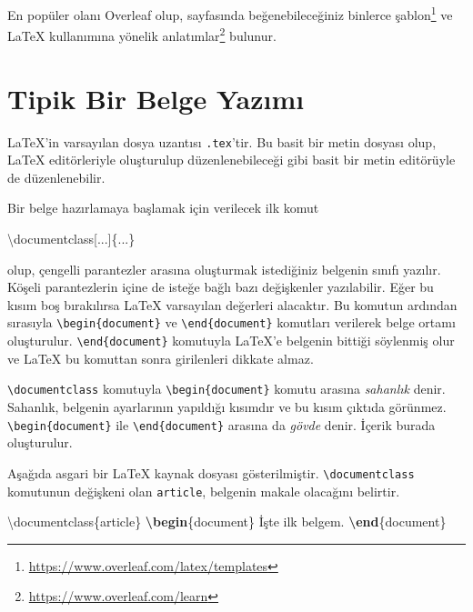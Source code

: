 \documentclass[
  10pt,
]{scrbook}
\newenvironment{Shaded}{\begin{snugshade}}{\end{snugshade}}
\newcommand{\BuiltInTok}[1]{#1}
\newcommand{\ExtensionTok}[1]{#1}
\newcommand{\KeywordTok}[1]{\textcolor[rgb]{0.13,0.29,0.53}{\textbf{#1}}}
\newcommand{\NormalTok}[1]{#1}
\renewcommand{\href}[2]{#2\footnote{\url{#1}}}
\theoremstyle{definition}
\theoremstyle{definition}
\theoremstyle{definition}
\theoremstyle{definition}
\theoremstyle{remark}
\begin{document}
En popüler olanı Overleaf olup, sayfasında beğenebileceğiniz binlerce \href{https://www.overleaf.com/latex/templates}{şablon} ve LaTeX kullanımına yönelik \href{https://www.overleaf.com/learn}{anlatımlar} bulunur.

\hypertarget{tipik}{%
\section{Tipik Bir Belge Yazımı}\label{tipik}}

LaTeX'in varsayılan dosya uzantısı \texttt{.tex}'tir. Bu basit bir metin dosyası olup, LaTeX editörleriyle oluşturulup düzenlenebileceği gibi basit bir metin editörüyle de düzenlenebilir.

Bir belge hazırlamaya başlamak için verilecek ilk komut

\begin{Shaded}
\begin{Highlighting}[]
\BuiltInTok{\textbackslash{}documentclass}\NormalTok{[...]\{}\ExtensionTok{...}\NormalTok{\}}
\end{Highlighting}
\end{Shaded}

olup, çengelli parantezler arasına oluşturmak istediğiniz belgenin sınıfı yazılır. Köşeli parantezlerin içine de isteğe bağlı bazı değişkenler yazılabilir. Eğer bu kısım boş bırakılırsa LaTeX varsayılan değerleri alacaktır. Bu komutun ardından sırasıyla \texttt{\textbackslash{}begin\{document\}} ve \texttt{\textbackslash{}end\{document\}} komutları verilerek belge ortamı oluşturulur. \texttt{\textbackslash{}end\{document\}} komutuyla LaTeX'e belgenin bittiği söylenmiş olur ve LaTeX bu komuttan sonra girilenleri dikkate almaz.

\texttt{\textbackslash{}documentclass} komutuyla \texttt{\textbackslash{}begin\{document\}} komutu arasına \emph{sahanlık} denir. Sahanlık, belgenin ayarlarının yapıldığı kısımdır ve bu kısım çıktıda görünmez. \texttt{\textbackslash{}begin\{document\}} ile \texttt{\textbackslash{}end\{document\}} arasına da \emph{gövde} denir. İçerik burada oluşturulur.

Aşağıda asgari bir LaTeX kaynak dosyası gösterilmiştir. \texttt{\textbackslash{}documentclass} komutunun değişkeni olan \texttt{article}, belgenin makale olacağını belirtir.

\begin{Shaded}
\begin{Highlighting}[]
\BuiltInTok{\textbackslash{}documentclass}\NormalTok{\{}\ExtensionTok{article}\NormalTok{\}}
\KeywordTok{\textbackslash{}begin}\NormalTok{\{}\ExtensionTok{document}\NormalTok{\}}
\NormalTok{  İşte ilk belgem.}
\KeywordTok{\textbackslash{}end}\NormalTok{\{}\ExtensionTok{document}\NormalTok{\}}
\end{Highlighting}
\end{Shaded}
\end{document}
